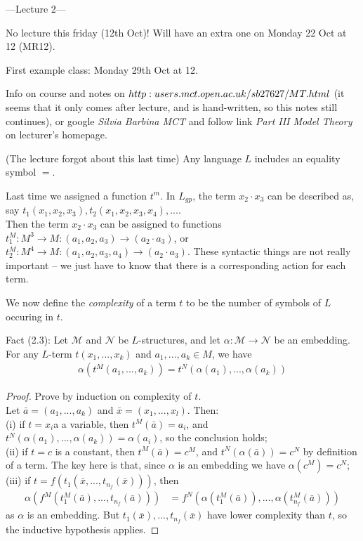 \documentclass[a4paper]{article}
\begin{document}
---Lecture 2---

No lecture this friday (12th Oct)! Will have an extra one on Monday 22 Oct at 12 (MR12).

First example class: Monday 29th Oct at 12.

Info on course and notes on $http:\\users.mct.open.ac.uk/sb27627/MT.html$ (it seems that it only comes after lecture, and is hand-written, so this notes still continues), or google \emph{Silvia Barbina MCT} and follow link \emph{Part III Model Theory} on lecturer's homepage.

\begin{rem}
    (The lecture forgot about this last time) Any language $L$ includes an equality symbol $=$.
\end{rem}

Last time we assigned a function $t^m$. In $L_{gp}$, the term $x_2 \cdot x_3$ can be described as, say $t_1(x_1,x_2,x_3),t_2(x_1,x_2,x_3,x_4),...$.\\
Then the term $x_2 \cdot x_3$ can be assigned to functions $t_1^M:M^3\to M:(a_1,a_2,a_3) \to (a_2 \cdot a_3)$, or $t_2^M: M^4 \to M: (a_1,a_2,a_3,a_4) \to (a_2 \cdot a_3)$. These syntactic things are not really important -- we just have to know that there is a corresponding action for each term.

We now define the \emph{complexity} of a term $t$ to be the number of symbols of $L$ occuring in $t$.

Fact (2.3): Let $\mathcal{M}$ and $\mathcal{N}$ be $L$-structures, and let $\alpha:\mathcal{M} \to \mathcal{N}$ be an embedding. For any $L$-term $t(x_1,...,x_k)$ and $a_1,...,a_k \in M$, we have
\begin{equation*}
    \begin{aligned}
        \alpha(t^M(a_1,...,a_k)) = t^N(\alpha(a_1),...,\alpha(a_k))
    \end{aligned}
\end{equation*}
\begin{proof}
Prove by induction on complexity of $t$.\\
Let $\bar{a} = (a_1,...,a_k)$ and $\bar{x} = (x_1,...,x_l)$. Then:\\
(i) if $t=x_i$a a variable, then $t^M(\bar{a}) = a_i$, and $t^N(\alpha(a_1),...,\alpha(a_k)) = \alpha(a_i)$, so the conclusion holds;\\
(ii) if $t=c$ is a constant, then $t^M(\bar{a}) = c^M$, and $t^N(\alpha(\bar{a})) = c^N$ by definition of a term. The key here is that, since $\alpha$ is an embedding we have $\alpha(c^M) = c^N$;\\
(iii) if $t = f(t_1(\bar{x},...,t_{n_f}(\bar{x})))$, then
\begin{equation*}
    \begin{aligned}
    \alpha(f^M(t_1^M(\bar{a}),...,t_{n_f}(\bar{a}))) &= f^N(\alpha (t_1^M(\bar{a})),...,\alpha(t_{n_f}^M(\bar{a})))
    \end{aligned}
\end{equation*}
as $\alpha$ is an embedding. But $t_1(\bar{x}),...,t_{n_f}(\bar{x})$ have lower complexity than $t$, so the inductive hypothesis applies.
\end{proof}
\end{document}
